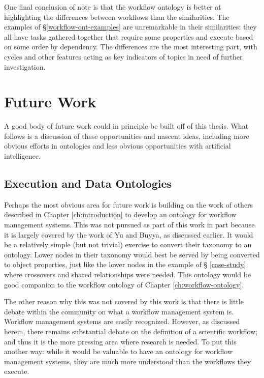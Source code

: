 One final conclusion of note is that the workflow ontology is better at
highlighting the differences between workflows than the similarities. The
examples of \S \ref{workflow-ont-examples} are unremarkable in their
similarities: they all have tasks gathered together that require some properties
and execute based on some order by dependency. The differences are the most
interesting part, with cycles and other features acting as key indicators of
topics in need of further investigation.

\section{Future Work}

A good body of future work could in principle be built off of this
thesis. What follows is a discussion of these opportunities and nascent ideas,
including more obvious efforts in ontologies and less obvious opportunities with
artificial intelligence.

\subsection{Execution and Data Ontologies}

Perhaps the most obvious area for future work is building on the work of others
described in Chapter \ref{ch:introduction} to develop an ontology for workflow
management systems. This was not pursued as part of this work in part because it
is largely covered by the work of Yu and Buyya, as discussed earlier. It would
be a relatively simple (but not trivial) exercise to convert their taxonomy to
an ontology. Lower nodes in their taxonomy would best be served by being
converted to object properties, just like the lower nodes in the example of \S
\ref{case-study} where crossovers and shared relationships were needed. This
ontology would be good companion to the workflow ontology of Chapter
\ref{ch:workflow-ontology}.

The other reason why this was not covered by this work is that there is little
debate within the community on what a workflow management system is. Workflow
management systems are easily recognized. However, as discussed herein, there
remains substantial debate on the definition of a scientific workflow; and thus
it is the more pressing area where research is needed. To put this another way:
while it would be valuable to have an ontology for workflow management systems,
they are much more understood than the workflows they execute.

